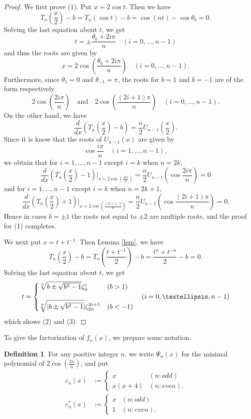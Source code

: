 \documentclass[a4paper, 11pt]{amsart}
\numberwithin{equation}{section}
\theoremstyle{definition}
\newtheorem{defn}[thm]{Definition}
\begin{document}
\begin{proof}
We first prove (1).
Put $x=2\cos t$.
Then we have
\[
T_n\left(\frac x2 \right) -b=T_n(\cos t)-b=\cos (nt)-\cos\theta_b=0.
\]
Solving the last equation about $t$, we get
\[
t=\pm \frac{\theta_b+2i\pi}n\quad (i=0,\dots,n-1)
\]
and thus the roots are given by
\[
x=2\cos\left(\frac{\theta_b+2i\pi}n\right)\quad (i=0,\dots,n-1).
\]
Furthermore,  since $\theta_1=0$ and $\theta_{-1}=\pi$, the roots for $b=1$ and $b=-1$ are of the form respectively
$$
2\cos\left(\frac{2i\pi}n\right)\quad\text{and}\quad  2\cos\left(\frac{(2i+1)\pi}n\right) \quad (i=0,\dots,n-1).
$$
On the other hand, we have 
$$
\frac{d}{dx}\left(T_n\left(\frac{x}2\right)-b\right)=\frac n2 U_{n-1}\left(\frac{x}2\right).
$$
Since it is know that the roots of $U_{n-1}(x)$ are given by
\[
\cos\frac{i\pi}{n}\quad (i=1,\dots, n-1),
\]
we obtain that for $i=1,\dots, n-1$ except $i=k$ when $n=2k$, 
\[
\frac{d}{dx}\left(T_n\left(\frac{x}2\right)-1\right)\Big|_{x=2\cos(\frac{2i\pi}n)}=\frac n2 U_{n-1}\left(\cos\frac{2i\pi}n\right)=0
\]
and for $i=1,\dots, n-1$ except $i=k$ when $n=2k+1$,
\[
\frac{d}{dx}\left(T_n\left(\frac{x}2\right)+1\right)\Big|_{x=2\cos(\frac{(2i+1)\pi}n)}=\frac n2 U_{n-1}\left(\cos\frac{(2i+1)\pi}n\right)=0.
\]
Hence in cases $b=\pm1$ the roots not equal to $\pm 2$ are multiple roots, and the proof for (1) completes.

We next  put $x= t + t^{-1}$. Then Lemma \ref{lem}, we have
$$
T_n\left(\frac x2 \right) -b= T_n\left(\frac{t + t^{-1}}{2}\right)-b = \frac{t^n + t^{-n}}{2} -b=0.
$$
Solving the last equation about $t$, we get
\[
 t = 
 \begin{cases}
 \sqrt[n]{b \pm \sqrt{b^2 - 1}}\zeta_n^i& (b>1)\bigskip\\
 \sqrt[n]{|b \pm \sqrt{b^2 - 1}|}\zeta_{2n}^{2i+1}&(b<-1)
 \end{cases}
 \quad (i=0,\dots,n-1)
\]
which shows (2) and (3).
\end{proof}


To give the factorization of $f_n(x)$, we prepare some notation.
\begin{defn}\label{def-c}
For any positive integer $n$, we write $\Psi_n(x)$ for the minimal polynomial of $2\cos(\frac{2\pi}n)$, and put
\begin{align*}
c_n(x)&:=
\begin{cases}
x& (n : odd)\\
x(x + 4) & (n : even).
\end{cases}\\
c^*_n(x)&:=
\begin{cases}
x& (n : odd)\\
1& (n : even).
\end{cases}
\end{align*}
\end{defn}
\end{document}
